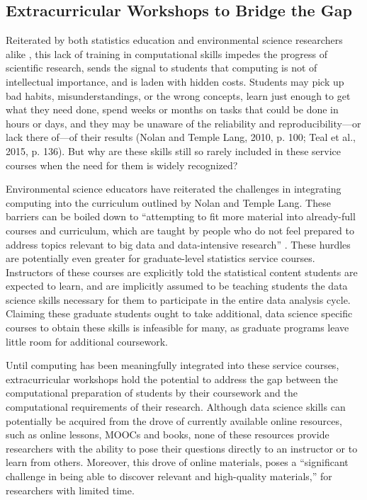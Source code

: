\documentclass[12pt]{article}
\begin{document}
\subsection{Extracurricular Workshops to Bridge the Gap}

\quad Reiterated by both statistics education and environmental science 
researchers alike \citep{nolan, datacarpentry}, this lack of training in 
computational skills impedes the progress of scientific research, sends the 
signal to students that computing is not of intellectual importance, and is 
laden with hidden costs. Students may pick up bad habits, misunderstandings, or 
the wrong concepts, learn just enough to get what they need done, spend weeks or
months on tasks that could be done in hours or days, and they may be unaware of 
the reliability and reproducibility---or lack there of---of their results (Nolan
and Temple Lang, 2010, p. 100; Teal et al., 2015, p. 136). But why are these
skills still so rarely included in these service courses when the need for them
is widely recognized?

\quad Environmental science educators have reiterated the challenges in 
integrating computing into the curriculum outlined by Nolan and Temple Lang. 
These barriers can be boiled down to ``attempting to fit more material into
already-full courses and curriculum, which are taught by people who do not feel
prepared to address topics relevant to big data and data-intensive research'' 
\citep[p. 547]{hampton}. These hurdles are potentially even greater for 
graduate-level statistics service courses. Instructors of these courses are 
explicitly told the statistical content students are expected to learn, 
and are implicitly assumed to be teaching students the data science skills 
necessary for them to participate in the entire data analysis cycle. Claiming 
these graduate students ought to take additional, data science specific courses
to obtain these skills is infeasible for many, as graduate programs leave little
room for additional coursework. 

\quad Until computing has been meaningfully integrated into these service 
courses, extracurricular workshops hold the potential to address the gap between
the computational preparation of students by their coursework and the 
computational requirements of their research. Although data science skills can 
potentially be acquired from the drove of currently available online resources, 
such as online lessons, MOOCs and books, none of these resources provide
researchers with the ability to pose their questions directly to an instructor
or to learn from others. Moreover, this drove of online materials, poses a  
``significant challenge in being able to discover relevant and high-quality
materials,'' for researchers with limited time. 
\end{document}
